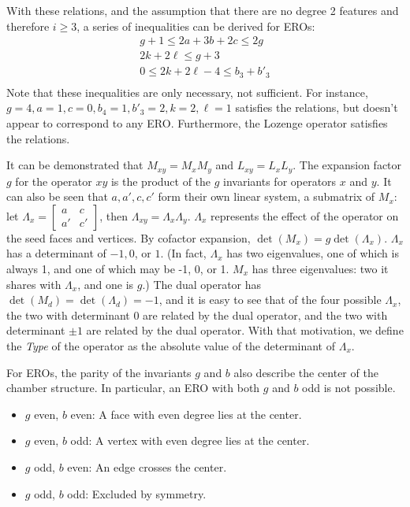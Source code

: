 \documentclass{amsart}[12pt]
\begin{document}
With these relations, and the assumption that there are no degree 2 features
and therefore $i \ge 3$, a series of inequalities can be derived for EROs:
\begin{equation}
  \begin{split}
  g + 1 \le 2a + 3b + 2c \le 2g \\
  2k + 2\ell \le g + 3 \\
  0 \le 2k + 2\ell - 4 \le b_3 + b'_3 \\
  \end{split}
\end{equation}
Note that these inequalities are only necessary, not sufficient. For instance,
$g=4, a=1, c=0, b_4 = 1, b'_3=2, k=2, \ell=1$ satisfies the relations, but
doesn't appear to correspond to any ERO. Furthermore, the Lozenge operator
satisfies the relations.

It can be demonstrated that $M_{xy} = M_{x}M_{y}$ and $L_{xy} = L_{x}L_{y}$.
The expansion factor $g$ for the operator $xy$ is the product of the $g$
invariants for operators $x$ and $y$. It can also be seen that $a, a', c, c'$
form their own linear system, a submatrix of $M_x$: let $\Lambda_x =
\begin{bmatrix} a & c \\ a' & c' \end{bmatrix}$, then $\Lambda_{xy} = \Lambda_x
\Lambda_y$. $\Lambda_x$ represents the effect of the operator on the seed
faces and vertices. By cofactor expansion, $\det (M_x) = g \det (\Lambda_x)$.
$\Lambda_x$ has a determinant of $-1, 0$, or $1$. (In fact, $\Lambda_x$ has two
eigenvalues, one of which is always 1, and one of which may be -1, 0, or 1.
$M_x$ has three eigenvalues: two it shares with $\Lambda_x$, and one is $g$.)
The dual operator has $\det (M_d) = \det (\Lambda_d) = -1$, and it is easy to
see that of the four possible $\Lambda_x$, the two with determinant 0 are
related by the dual operator, and the two with determinant $\pm 1$ are related
by the dual operator. With that motivation, we define the \textit{Type} of the
operator as the absolute value of the determinant of $\Lambda_x$.

For EROs, the parity of the invariants $g$ and $b$ also describe the center of the chamber structure.
In particular, an ERO with both $g$ and $b$ odd is not possible.
\begin{itemize}
  \item $g$ even, $b$ even: A face with even degree lies at the center.
  \item $g$ even, $b$ odd: A vertex with even degree lies at the center.
  \item $g$ odd, $b$ even: An edge crosses the center.
  \item $g$ odd, $b$ odd: Excluded by symmetry.
\end{itemize}
\end{document}
